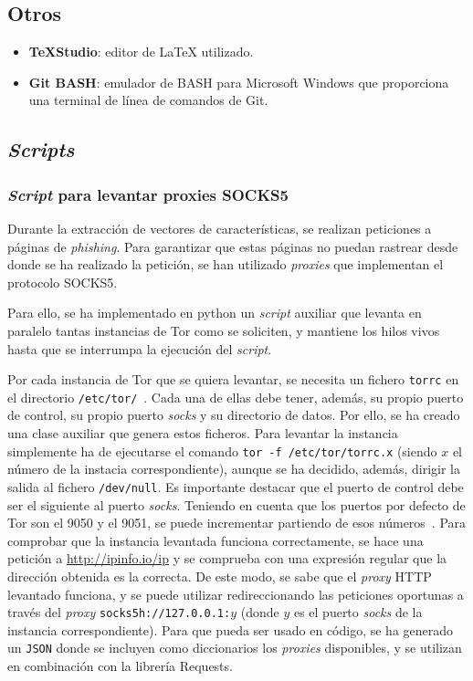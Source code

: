 \subsection{Otros}

\begin{itemize}
	\item \textbf{\TeX{}Studio}: editor de \LaTeX{} utilizado.
	\item \textbf{Git BASH}: emulador de BASH para Microsoft Windows que proporciona una terminal de línea de comandos de Git.
\end{itemize}


\subsection{\textit{Scripts}} 
\subsubsection{\textit{Script} para levantar proxies SOCKS5}
\label{sec:script_tor}
Durante la extracción de vectores de características, se realizan peticiones a páginas de \textit{phishing}. Para garantizar que estas páginas no puedan rastrear desde donde se ha realizado la petición, se han utilizado \textit{proxies} que implementan el protocolo SOCKS5.

Para ello, se ha implementado en python un \textit{script} auxiliar que levanta en paralelo tantas instancias de Tor como se soliciten, y mantiene los hilos vivos hasta que se interrumpa la ejecución del \textit{script}.

Por cada instancia de Tor que se quiera levantar, se necesita un fichero \texttt{torrc} en el directorio \texttt{/etc/tor/}~\cite{TorFicherosTor}. Cada una de ellas debe tener, además, su propio puerto de control, su propio puerto \textit{socks} y su directorio de datos. Por ello, se ha creado una clase auxiliar que genera estos ficheros. Para levantar la instancia simplemente ha de ejecutarse el comando \texttt{tor -f /etc/tor/torrc.x} (siendo $x$ el número de la instacia correspondiente), aunque se ha decidido, además, dirigir la salida al fichero \texttt{/dev/null}. Es importante destacar que el puerto de control debe ser el siguiente al puerto \textit{socks}. Teniendo en cuenta que los puertos por defecto de Tor son el 9050 y el 9051, se puede incrementar partiendo de esos números~\cite{TorficheroComando}. Para comprobar que la instancia levantada funciona correctamente, se hace una petición a \url{http://ipinfo.io/ip} y se comprueba con una expresión regular que la dirección obtenida es la correcta. De este modo, se sabe que el \textit{proxy} HTTP levantado funciona, y se puede utilizar redireccionando las peticiones oportunas a través del \textit{proxy} \texttt{socks5h://127.0.0.1:$y$} (donde $y$ es el puerto \textit{socks} de la instancia correspondiente). Para que pueda ser usado en código, se ha generado un \texttt{JSON} donde se incluyen como diccionarios los \textit{proxies} disponibles, y se utilizan en combinación con la librería Requests.

